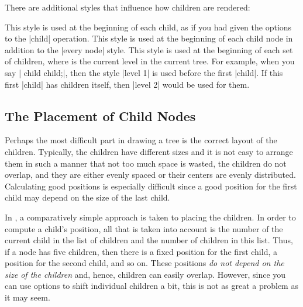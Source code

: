 There are additional styles that influence how children are rendered:
\begin{itemize}
  This style is used at the beginning of each child, as if you had
  given the options to the |child| operation.
  This style is used at the beginning of each child node in addition
  to the |every node| style.
  This style is used at the beginning of each set of children, where
   is the current level in the current tree. For example,
  when you say | child child;|, then the style |level 1| is
  used before the first |child|. If this first |child| has children
  itself, then |level 2| would be used for them.

\begin{codeexample}[]
\end{codeexample}
\end{itemize}




\subsection{The Placement of Child Nodes}

\label{section-tree-placement}

Perhaps the most difficult part in drawing a tree is the correct
layout of the children. Typically, the children have different sizes
and it is not easy to arrange them in such a manner that not too much
space is wasted, the children do not overlap, and they are either 
evenly spaced or their centers are evenly distributed. Calculating
good positions is especially difficult since a good position for the
first child may depend on the size of the last child.

In \tikzname, a comparatively simple approach is taken to placing the
children. In order to compute a child's position, all that is taken
into account is the number of the current child in the list of
children and the number of children in this list. Thus, if a node has
five children, then there is a fixed position for the first child, a
position for the second child, and so on. These positions \emph{do not
  depend on the size of the children} and, hence, children can easily
overlap. However, since you can use options to shift individual
children a bit, this is not as great a problem as it may seem.

